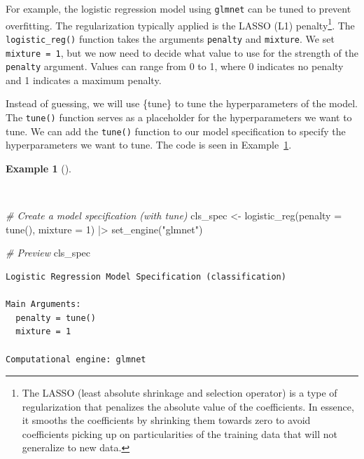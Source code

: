 \documentclass[
  letterpaper,
  krantz1]{latex/krantz-mod}
\newenvironment{Shaded}{\begin{snugshade}}{\end{snugshade}}
\newcommand{\AttributeTok}[1]{\textcolor[rgb]{0.00,0.00,0.00}{#1}}
\newcommand{\CommentTok}[1]{\textcolor[rgb]{0.00,0.00,0.00}{\textit{#1}}}
\newcommand{\DecValTok}[1]{\textcolor[rgb]{0.00,0.00,0.00}{#1}}
\newcommand{\FunctionTok}[1]{\textcolor[rgb]{0.00,0.00,0.00}{#1}}
\newcommand{\NormalTok}[1]{\textcolor[rgb]{0.00,0.00,0.00}{#1}}
\newcommand{\OtherTok}[1]{\textcolor[rgb]{0.00,0.00,0.00}{#1}}
\newcommand{\SpecialCharTok}[1]{\textcolor[rgb]{0.00,0.00,0.00}{#1}}
\newcommand{\StringTok}[1]{\textcolor[rgb]{0.00,0.00,0.00}{#1}}
\theoremstyle{definition}
\theoremstyle{definition}
\newtheorem{example}{Example}[chapter]
\theoremstyle{remark}
\begin{document}
For example, the logistic regression model using \texttt{glmnet} can be
tuned to prevent overfitting. The regularization typically applied is
the LASSO (L1) penalty\footnote{The LASSO (least absolute shrinkage and
  selection operator) is a type of regularization that penalizes the
  absolute value of the coefficients. In essence, it smooths the
  coefficients by shrinking them towards zero to avoid coefficients
  picking up on particularities of the training data that will not
  generalize to new data.}. The \texttt{logistic\_reg()} function takes
the arguments \texttt{penalty} and \texttt{mixture}. We set
\texttt{mixture\ =\ 1}, but we now need to decide what value to use for
the strength of the \texttt{penalty} argument. Values can range from 0
to 1, where 0 indicates no penalty and 1 indicates a maximum penalty.

Instead of guessing, we will use \{tune\} to tune the hyperparameters of
the model. The \texttt{tune()} function serves as a placeholder for the
hyperparameters we want to tune. We can add the \texttt{tune()} function
to our model specification to specify the hyperparameters we want to
tune. The code is seen in
Example~\ref{exm-predict-class-model-spec-tune}.

\begin{example}[]\protect\hypertarget{exm-predict-class-model-spec-tune}{}\label{exm-predict-class-model-spec-tune}

~

\begin{Shaded}
\begin{Highlighting}[numbers=left,,]
\CommentTok{\# Create a model specification (with tune)}
\NormalTok{cls\_spec }\OtherTok{\textless{}{-}}
  \FunctionTok{logistic\_reg}\NormalTok{(}\AttributeTok{penalty =} \FunctionTok{tune}\NormalTok{(), }\AttributeTok{mixture =} \DecValTok{1}\NormalTok{) }\SpecialCharTok{|\textgreater{}}
  \FunctionTok{set\_engine}\NormalTok{(}\StringTok{"glmnet"}\NormalTok{)}

\CommentTok{\# Preview}
\NormalTok{cls\_spec}
\end{Highlighting}
\end{Shaded}

\begin{verbatim}
Logistic Regression Model Specification (classification)

Main Arguments:
  penalty = tune()
  mixture = 1

Computational engine: glmnet
\end{verbatim}

\end{example}
\end{document}
